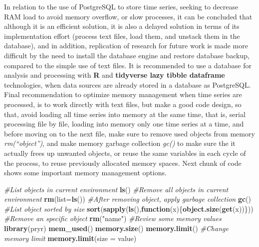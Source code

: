 \documentclass[12pt,oneside]{reedthesis}
\newenvironment{Shaded}{\begin{snugshade}}{\end{snugshade}}
\newcommand{\CommentTok}[1]{\textcolor[rgb]{0.56,0.35,0.01}{\textit{#1}}}
\newcommand{\ControlFlowTok}[1]{\textcolor[rgb]{0.13,0.29,0.53}{\textbf{#1}}}
\newcommand{\DataTypeTok}[1]{\textcolor[rgb]{0.13,0.29,0.53}{#1}}
\newcommand{\KeywordTok}[1]{\textcolor[rgb]{0.13,0.29,0.53}{\textbf{#1}}}
\newcommand{\NormalTok}[1]{#1}
\newcommand{\StringTok}[1]{\textcolor[rgb]{0.31,0.60,0.02}{#1}}
\begin{document}
In relation to the use of PostgreSQL to store time series, seeking to decrease RAM load to avoid memory overflow, or slow processes, it can be concluded that although it is an efficient solution, it is also a delayed solution in terms of its implementation effort (process text files, load them, and unstack them in the database), and in addition, replication of research for future work is made more difficult by the need to install the database engine and restore database backup, compared to the simple use of text files. It is recommended to use a database for analysis and processing with \textbf{R} and \textbf{tidyverse lazy tibble dataframe} technologies, when data sources are already stored in a database as PostgreSQL. Final recommendation to optimize memory management when time series are processed, is to work directly with text files, but make a good code design, so that, avoid loading all time series into memory at the same time, that is, serial processing file by file, loading into memory only one time series at a time, and before moving on to the next file, make sure to remove used objects from memory \emph{rm(``object'')}, and make memory garbage collection \emph{gc()} to make sure the it actually frees up unwanted objects, or reuse the same variables in each cycle of the process, to reuse previously allocated memory spaces. Next chunk of code shows some important memory management options.

\scriptsize
\begin{Shaded}
\begin{Highlighting}[]
    \CommentTok{#List objects in current environment}
      \KeywordTok{ls}\NormalTok{()}
    \CommentTok{#Remove all objects in current environment}
      \KeywordTok{rm}\NormalTok{(}\DataTypeTok{list=}\KeywordTok{ls}\NormalTok{())}
    \CommentTok{#After removing object, apply garbage collection}
      \KeywordTok{gc}\NormalTok{()}
    \CommentTok{#List object sorted by size}
      \KeywordTok{sort}\NormalTok{(}\KeywordTok{sapply}\NormalTok{(}\KeywordTok{ls}\NormalTok{(),}\ControlFlowTok{function}\NormalTok{(x)\{}\KeywordTok{object.size}\NormalTok{(}\KeywordTok{get}\NormalTok{(x))\}))}
    \CommentTok{#Remove an specific object}
      \KeywordTok{rm}\NormalTok{(}\StringTok{"name"}\NormalTok{)}
    \CommentTok{#Review some memory values}
      \KeywordTok{library}\NormalTok{(pryr)}
      \KeywordTok{mem_used}\NormalTok{()}
      \KeywordTok{memory.size}\NormalTok{()}
      \KeywordTok{memory.limit}\NormalTok{()}
    \CommentTok{#Change memory limit}
      \KeywordTok{memory.limit}\NormalTok{(}\DataTypeTok{size =}\NormalTok{ value)}
\end{Highlighting}
\end{Shaded}
\normalsize
\end{document}
